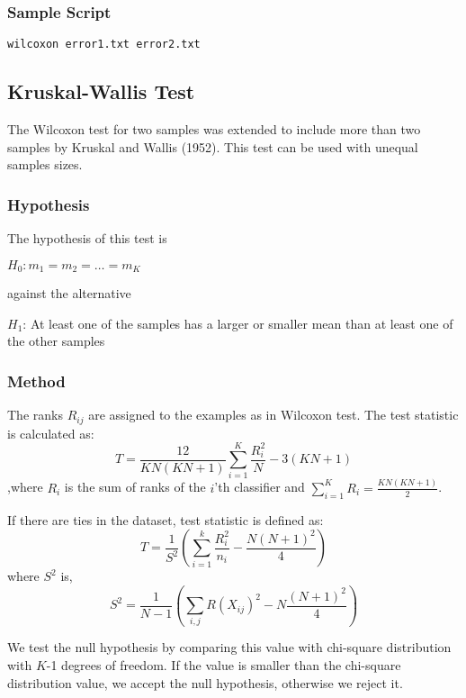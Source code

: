 \documentclass[a4paper,12pt]{book}
\begin{document}
\subsubsection{Sample Script}
\begin{verbatim}
wilcoxon error1.txt error2.txt
\end{verbatim}

\subsection{Kruskal-Wallis Test}
The Wilcoxon test for two samples was extended to include more than two samples by Kruskal and Wallis (1952).
This test can be used with unequal samples sizes.

\subsubsection{Hypothesis}
The hypothesis of this test is
\begin{center}
$H_0: m_1=m_2=\ldots=m_K$
\end{center}
against the alternative
\begin{center}
$H_1$: At least one of the samples has a larger or smaller mean than at least one of the other
samples
\end{center}

\subsubsection{Method}
The ranks $R_{ij}$ are assigned to the examples as in Wilcoxon test. The test statistic is calculated as:
\begin{equation}
T=\frac{12}{KN(KN+1)}\sum_{i=1}^K\frac{R_i^2}{N}-3(KN+1)
\end{equation}
,where $R_i$ is the sum of ranks of the $i$'th classifier and $\sum_{i=1}^KR_i=\frac{KN(KN+1)}{2}$.

If there are ties in the dataset, test statistic is defined as:
\begin{equation}
T=\frac{1}{S^2}(\sum_{i=1}^k\frac{R_i^2}{n_i}-\frac{N(N+1)^2}{4})
\end{equation}
where $S^2$ is,
\begin{equation}
S^2=\frac{1}{N-1}(\sum_{i, j}R(X_{ij})^2-N\frac{(N+1)^2}{4})
\end{equation}

We test the null hypothesis by comparing this value with chi-square distribution with $K$-1 degrees of freedom.
If the value is smaller than the chi-square distribution value, we accept the null hypothesis, otherwise we reject it.
\end{document}
